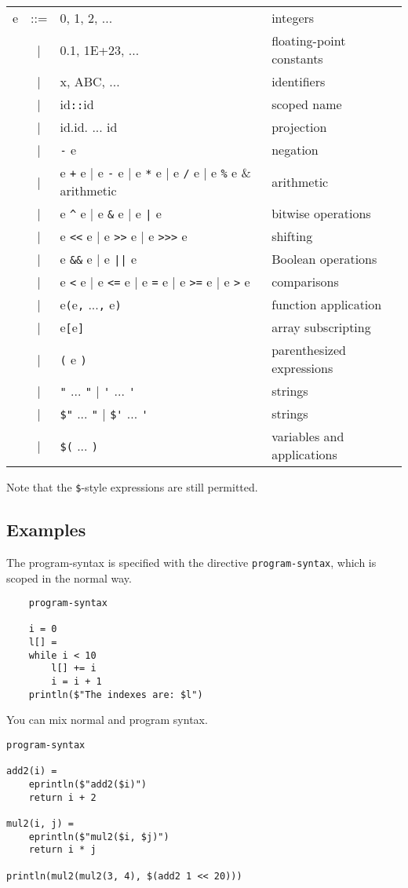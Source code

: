 \begin{tabular}{rcll}
e & ::= & 0, 1, 2, ...    & integers\\
  & |   & 0.1, 1E+23, ... & floating-point constants\\
  & |   & x, ABC, ...     & identifiers\\
  & |   & id\verb+::+id   & scoped name\\
  & |   & id.id. ... id   & projection\\
  & |   & \verb+-+ e      & negation\\
  & |   & e \verb/+/ e | e \verb/-/ e | e \verb+*+ e | e \verb+/+ e | e \verb+%+ e  & arithmetic\\
  & |   & e \verb+^+ e | e \verb+&+ e | e \verb+|+ e & bitwise operations\\
  & |   & e \verb+<<+ e  | e \verb+>>+  e | e \verb+>>>+ e & shifting\\
  & |   & e \verb+&&+ e  | e \verb+||+ e & Boolean operations\\
  & |   & e \verb+<+ e | e \verb+<=+ e | e \verb+=+ e | e \verb+>=+ e | e \verb+>+ e & comparisons\\
  & |   & e\verb+(+e\verb+,+ ...\verb+,+ e\verb+)+ & function application\\
  & |   & e\verb+[+e\verb+]+ & array subscripting\\
  & |   & \verb+(+ e \verb+)+ & parenthesized expressions\\
  & |   & \verb+"+ ... \verb+"+ | \verb+'+ ... \verb+'+ & strings\\
  & |   & \verb+$"+ ... \verb+"+ | \verb+$'+ ... \verb+'+ & strings\\
  & |   & \verb+$(+ ... \verb+)+ & variables and applications
\end{tabular}

Note that the \verb+$+-style expressions are still permitted.

\subsection{Examples}

The program-syntax is specified with the directive \verb+program-syntax+, which is scoped in the normal way.

\begin{verbatim}
    program-syntax

    i = 0
    l[] =
    while i < 10
        l[] += i
        i = i + 1
    println($"The indexes are: $l")
\end{verbatim}

You can mix normal and program syntax.

\begin{verbatim}
program-syntax

add2(i) =
    eprintln($"add2($i)")
    return i + 2

mul2(i, j) =
    eprintln($"mul2($i, $j)")
    return i * j

println(mul2(mul2(3, 4), $(add2 1 << 20)))
\end{verbatim}

